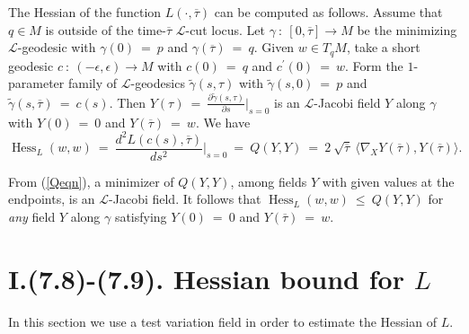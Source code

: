 \documentclass[12pt]{amsart}
\newcommand{\Hess}{\operatorname{Hess}}
\numberwithin{equation}{section}
\theoremstyle{plain}
\theoremstyle{definition}
\theoremstyle{remark}
\begin{document}
The Hessian of the function
$L(\cdot, \overline{\tau})$ can be computed as follows.
Assume that $q \in M$ is outside of the time-$\overline{\tau}$
${\mathcal L}$-cut locus. Let $\gamma \: : \: [0, \overline{\tau}]
\rightarrow M$ be the minimizing ${\mathcal L}$-geodesic with
$\gamma(0) \: = \: p$ and $\gamma(\overline{\tau}) \: = \: q$.
Given $w \in T_qM$, take a short geodesic $c \: : \: (-\epsilon, 
\epsilon) \rightarrow M$ with $c(0) \: = \: q$ and $c^\prime(0) \: = \: w$.
Form the $1$-parameter
family of ${\mathcal L}$-geodesics $\tilde\gamma(s, \tau)$ with
$\tilde\gamma(s, 0) \: = \: p$ and 
$\tilde\gamma(s, \overline{\tau}) \: = \: c(s)$.
Then $Y(\tau) \: = \: \frac{\partial \tilde\gamma(s, \tau)}{\partial s} 
\Big|_{s=0}$ is an ${\mathcal L}$-Jacobi field $Y$ along $\gamma$ with
$Y(0) \: = \: 0$ and $Y(\overline{\tau}) \: = \: w$. 
We have
\begin{equation} \label{hesseq}
\Hess_L(w, w) \: = \: \frac{d^2 L(c(s), 
\overline{\tau})}{ds^2} \Big|_{s=0} \: = \:
Q(Y, Y) \: = \:
2 \: \sqrt{\overline{\tau}} \: \langle \nabla_X Y(\overline{\tau}),
Y(\overline{\tau}) \rangle.
\end{equation}


From (\ref{Qeqn}),
a minimizer of
$Q(Y, Y)$, among fields $Y$ with given values at the endpoints,
is an ${\mathcal L}$-Jacobi field.
It follows that 
$\Hess_L(w, w) \: \le \: Q(Y, Y)$ for {\em any} field $Y$ along $\gamma$
satisfying
$Y(0) \: = \: 0$ and $Y(\overline{\tau}) \: = \: w$.


\section{I.(7.8)-(7.9). Hessian bound for $L$} \label{7.9}

In this section we use a test variation field in order to estimate
the Hessian of $L$.
\end{document}
